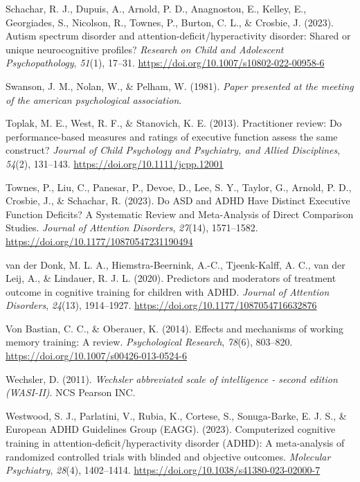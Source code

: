 \documentclass[
  letterpaper,
]{ut-thesis}
\newlength{\cslhangindent}
\newenvironment{CSLReferences}[2] %
 {\begin{list}{}{%
  \setlength{\itemindent}{0pt}
  \setlength{\leftmargin}{0pt}
  \setlength{\parsep}{0pt}
  \ifodd #1
   \setlength{\leftmargin}{\cslhangindent}
   \setlength{\itemindent}{-1\cslhangindent}
  \fi
  \setlength{\itemsep}{#2\baselineskip}}}
 {\end{list}}
\begin{document}
\begin{CSLReferences}{1}{0}
Schachar, R. J., Dupuis, A., Arnold, P. D., Anagnostou, E., Kelley, E.,
Georgiades, S., Nicolson, R., Townes, P., Burton, C. L., \& Crosbie, J.
(2023). Autism spectrum disorder and attention-deficit/hyperactivity
disorder: Shared or unique neurocognitive profiles? \emph{Research on
Child and Adolescent Psychopathology}, \emph{51}(1), 17--31.
\url{https://doi.org/10.1007/s10802-022-00958-6}

Swanson, J. M., Nolan, W., \& Pelham, W. (1981). \emph{Paper presented
at the meeting of the american psychological association}.

Toplak, M. E., West, R. F., \& Stanovich, K. E. (2013). Practitioner
review: Do performance-based measures and ratings of executive function
assess the same construct? \emph{Journal of Child Psychology and
Psychiatry, and Allied Disciplines}, \emph{54}(2), 131--143.
\url{https://doi.org/10.1111/jcpp.12001}

Townes, P., Liu, C., Panesar, P., Devoe, D., Lee, S. Y., Taylor, G.,
Arnold, P. D., Crosbie, J., \& Schachar, R. (2023). Do {ASD} and {ADHD
Have Distinct Executive Function Deficits}? {A Systematic Review} and
{Meta-Analysis} of {Direct Comparison Studies}. \emph{Journal of
Attention Disorders}, \emph{27}(14), 1571--1582.
\url{https://doi.org/10.1177/10870547231190494}

van der Donk, M. L. A., Hiemstra-Beernink, A.-C., Tjeenk-Kalff, A. C.,
van der Leij, A., \& Lindauer, R. J. L. (2020). Predictors and
moderators of treatment outcome in cognitive training for children with
{ADHD}. \emph{Journal of Attention Disorders}, \emph{24}(13),
1914--1927. \url{https://doi.org/10.1177/1087054716632876}

Von Bastian, C. C., \& Oberauer, K. (2014). Effects and mechanisms of
working memory training: A review. \emph{Psychological Research},
\emph{78}(6), 803--820. \url{https://doi.org/10.1007/s00426-013-0524-6}

Wechsler, D. (2011). \emph{Wechsler abbreviated scale of intelligence -
second edition ({WASI-II})}. NCS Pearson INC.

Westwood, S. J., Parlatini, V., Rubia, K., Cortese, S., Sonuga-Barke, E.
J. S., \& European ADHD Guidelines Group (EAGG). (2023). Computerized
cognitive training in attention-deficit/hyperactivity disorder ({ADHD}):
A meta-analysis of randomized controlled trials with blinded and
objective outcomes. \emph{Molecular Psychiatry}, \emph{28}(4),
1402--1414. \url{https://doi.org/10.1038/s41380-023-02000-7}


\end{CSLReferences}
\end{document}
